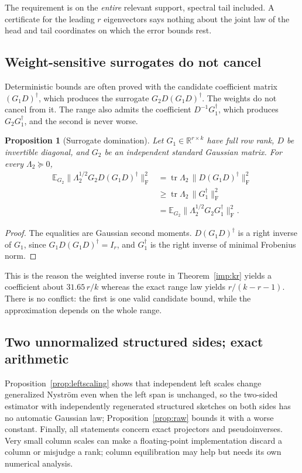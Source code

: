 \documentclass[11pt,a4paper]{article}
\newtheorem{proposition}[theorem]{Proposition}
\theoremstyle{definition}
\theoremstyle{remark}
\numberwithin{equation}{section}
\newcommand{\E}{\mathbb E}
\newcommand{\R}{\mathbb R}
\newcommand{\tr}{\operatorname{tr}}
\newcommand{\norm}[1]{\lVert#1\rVert}
\newcommand{\F}{\mathrm F}
\begin{document}
The requirement is on the \emph{entire} relevant support, spectral tail
included. A certificate for the leading $r$ eigenvectors says nothing about
the joint law of the head and tail coordinates on which the error bounds rest.

\subsection{Weight-sensitive surrogates do not cancel}

Deterministic bounds are often proved with the candidate coefficient matrix
$(G_1D)^\dagger$, which produces the surrogate $G_2D(G_1D)^\dagger$. The
weights do not cancel from it. The range also admits the coefficient
$D^{-1}G_1^\dagger$, which produces $G_2G_1^\dagger$, and the second is never worse.

\begin{proposition}[Surrogate domination]\label{prop:surrogate}
Let $G_1\in\R^{r\times k}$ have full row rank, $D$ be invertible diagonal, and
$G_2$ be an independent standard Gaussian matrix. For every $\Lambda_2\succeq0$,
\[
 \begin{aligned}
 \E_{G_2}\norm{\Lambda_2^{1/2}G_2D(G_1D)^\dagger}_\F^2
 &=\tr\Lambda_2\,\norm{D(G_1D)^\dagger}_\F^2\\
 &\ge\tr\Lambda_2\,\norm{G_1^\dagger}_\F^2\\
 &=\E_{G_2}\norm{\Lambda_2^{1/2}G_2G_1^\dagger}_\F^2 .
 \end{aligned}
\]
\end{proposition}

\begin{proof}
The equalities are Gaussian second moments. $D(G_1D)^\dagger$ is a right inverse of
$G_1$, since $G_1D(G_1D)^\dagger=I_r$, and $G_1^\dagger$ is the right inverse of
minimal Frobenius norm.
\end{proof}

This is the reason the weighted inverse route in
Theorem~\ref{imp:kr} yields a coefficient about $31.65\,r/k$ whereas the exact
range law yields $r/(k-r-1)$. There is no conflict: the first is one valid
candidate bound, while the approximation depends on the whole range.

\subsection{Two unnormalized structured sides; exact arithmetic}

Proposition~\ref{prop:leftscaling} shows that independent left scales change
generalized Nystr\"om even when the left span is unchanged, so the two-sided
estimator with independently regenerated structured sketches on both sides
has no automatic Gaussian law; Proposition~\ref{prop:raw} bounds it with a
worse constant. Finally, all statements concern exact projectors and
pseudoinverses. Very small column scales can make a floating-point
implementation discard a column or misjudge a rank; column equilibration may
help but needs its own numerical analysis.
\end{document}
